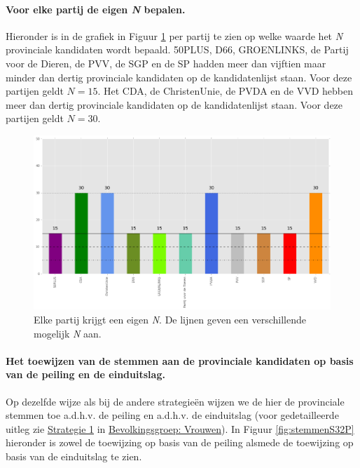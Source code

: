 \paragraph{Voor elke partij de eigen \textit{N} bepalen.}
Hieronder is in de grafiek in Figuur \ref{fig:XP} per partij te zien op welke waarde het \textit{N} provinciale kandidaten wordt bepaald. 50PLUS, D66, GROENLINKS, de Partij voor de Dieren, de PVV, de SGP en de SP hadden meer dan vijftien maar minder dan dertig provinciale kandidaten op de kandidatenlijst staan. Voor deze partijen geldt $N=15$. Het CDA, de ChristenUnie, de PVDA en de VVD hebben meer dan dertig provinciale kandidaten op de kandidatenlijst staan. Voor deze partijen geldt $N=30$.

\begin{figure}[H]

	\includegraphics[width=\linewidth]{eigenX_partijen_provincialen.png}

			\caption{Elke partij krijgt een eigen \textit{N}. De lijnen geven een verschillende mogelijk \textit{N} aan.} 

\label{fig:XP}
\end{figure}


\paragraph{Het toewijzen van de stemmen aan de provinciale kandidaten op basis van de peiling en de einduitslag.}
Op dezelfde wijze als bij de andere strategie\"{e}n wijzen we de hier de provinciale stemmen toe a.d.h.v. de peiling en a.d.h.v. de einduitslag (voor gedetailleerde uitleg zie \hyperref[S1V]{Strategie 1} in \hyperref[vrouwen]{Bevolkingsgroep: Vrouwen}). In Figuur \ref{fig:stemmenS32P} hieronder is zowel de toewijzing op basis van de peiling alsmede de toewijzing op basis van de einduitslag te zien.


